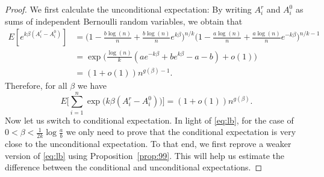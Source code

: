 \documentclass{article}
\begin{document}
\begin{proof}
We first calculate the unconditional expectation:
By writing $A^r_i$ and $A^0_i$ as sums of independent Bernoulli random variables, we obtain that
\begin{align*}
E[e^{k\beta(A^r_i-A^0_i)}]
& =\Big(1-\frac{b\log(n)}{n}+\frac{b\log(n)}{n} e^{k\beta} \Big)^{n/k}
\Big(1-\frac{a\log(n)}{n}+\frac{a\log(n)}{n} e^{-k\beta} \Big)^{n/k-1}  \\
& = 
\exp\Big(\frac{\log(n)}{k} ( a e^{-k\beta}+b e^{k\beta} -a-b )
+o(1) \Big) \\
& = (1+o(1)) n^{g(\beta)-1} .
\end{align*}
Therefore, for all $\beta$ we have
\begin{equation} \label{eq:lb}
E \Big[ \sum_{i=1}^n  \exp\big(k\beta (A^r_i-A^0_i) \big) \Big]
= (1+o(1)) n^{g(\beta)}  .
\end{equation}
Now let us switch to conditional expectation. In light of \eqref{eq:lb}, for the case of $0<\beta<\frac{1}{2k}\log\frac{a}{b}$ we only need to prove that the conditional expectation is very close to the unconditional expectation.
To that end, we first reprove a weaker version of \eqref{eq:lb} using Proposition~\ref{prop:99}. This will help us estimate the difference between the conditional and unconditional expectations.


\end{proof}
\end{document}
